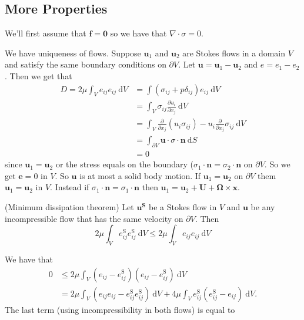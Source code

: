 \documentclass{article}
\begin{document}
	\subsection{More Properties}
	We'll first assume that $ \mathbf f = \mathbf 0 $ so we have that $ \nabla \cdot \sigma = 0 $.\par
We have uniqueness of flows. Suppose $ \mathbf u_1 $ and $ \mathbf u_2 $ are Stokes flows in a domain $ V $ and satisfy the same boundary conditions on $ \partial V $. Let $ \mathbf u = \mathbf u_1 - \mathbf u_2 $ and $ e = e_1-e_2 $. Then we get that
		\begin{align*}
			D = 2\mu \int_V e_{ij}e_{ij}\ \mathrm dV &= \int (\sigma_{ij} +  p\delta_{ij})e_{ij}\ \mathrm dV \\
								 &= \int_V \sigma_{ij}\frac{\partial u_i}{\partial x_j}\ \mathrm dV \\ 
								 &= \int_V \frac{\partial}{\partial x_j}(u_i\sigma_{ij}) - u_i\frac{\partial}{\partial x_j}\sigma_{ij}\ \mathrm dV \\
								 &= \int_{\partial V} \mathbf u \cdot \sigma \cdot\mathbf n \ \mathrm dS \\
								 &= 0
		\end{align*}
		since $ \mathbf u_1 = \mathbf u_2 $ or the stress equals on the boundary ($ \sigma_1\cdot\mathbf n =\sigma_2\cdot\mathbf n $ on $ \partial V $. So we get $ \mathbf e = 0 $ in $ V $. So $ \mathbf u $ is at most a solid body motion. If $ \mathbf u_1 = \mathbf u_2 $ on $ \partial V $ them $ \mathbf u_1 = \mathbf u_2 $ in $ V $. Instead if $ \sigma_1\cdot\mathbf n = \sigma_1\cdot\mathbf n $ then $ \mathbf u_1 = \mathbf u_2 +\mathbf U + \boldsymbol\Omega \times \mathbf x $.
\begin{theorem}
	(Minimum dissipation theorem) Let $ \mathbf u^{\mathbf S} $ be a Stokes flow in $ V $ and $ \mathbf u $ be any incompressible flow that has the same velocity on $ \partial V $. Then
	\[
		2\mu \int_V e_{ij}^{\mathrm S} e_{ij}^{\mathrm S}\ \mathrm dV \le 2\mu \int_V e_{ij}e_{ij}\ \mathrm dV
	\]
\end{theorem}
\pf We have that
\begin{align*}
	0 &\le 2\mu \int_V (e_{ij}-e^{\mathrm S}_{ij})(e_{ij} -e_{ij}^{\mathrm S}) \ \mathrm dV \\
	  &= 2\mu \int_V (e_{ij}e_{ij} - e^{\mathrm S}_{ij}e^{\mathrm S}_{ij}) \ \mathrm dV + 4\mu \int_V e^{\mathrm S}_{ij}(e^{\mathrm S}_{ij} - e_{ij})\ \mathrm dV.
\end{align*}
The last term (using incompressibility in both flows) is equal to
\end{document}
